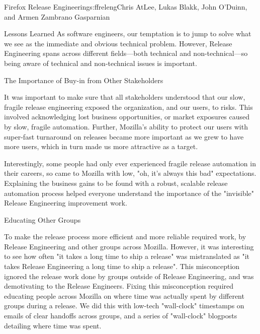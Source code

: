 \begin{aosachapter}{Firefox Release Engineering}{s:ffreleng}{Chris AtLee, Lukas Blakk, John O'Duinn, and Armen Zambrano Gasparnian}
\begin{aosasect1}{Lessons Learned}
As software engineers, our temptation is to jump to solve what we
see as the immediate and obvious technical problem. However, Release
Engineering spans across different fields---both technical and 
non-technical---so being aware of technical and non-technical issues is important.

\begin{aosasect2}{The Importance of Buy-in from Other Stakeholders}

It was important to make sure that all stakeholders understood that our
slow, fragile release engineering exposed the organization, and our users, to
risks. This involved acknowledging lost business opportunities, or market
exposures caused by slow, fragile automation. Further, Mozilla's ability to
protect our users with super-fast turnaround on releases became more important
as we grew to have more users, which in turn made us more attractive as a
target.

Interestingly, some people had only ever experienced fragile release automation
in their careers, so came to Mozilla with low, "oh, it's always this bad"
expectations. Explaining the business gains to be found with a robust, scalable
release automation process helped everyone understand the importance of the
"invisible" Release Engineering improvement work.

\end{aosasect2}

\begin{aosasect2}{Educating Other Groups}

To make the release process more efficient and more reliable required work, by
Release Engineering and other groups across Mozilla. However, it was
interesting to see how often "it takes a long time to ship a release" was
mistranslated as "it takes Release Engineering a long time to ship a release".
This misconception ignored the release work done by groups outside of Release
Engineering, and was demotivating to the Release Engineers. Fixing this
misconception required educating people across Mozilla on where time was
actually spent by different groups during a release.  We did this with low-tech
"wall-clock" timestamps on emails of clear handoffs across groups, and a series
of "wall-clock" blogposts detailing where time was spent.


\end{aosasect2}
\end{aosasect1}
\end{aosachapter}
